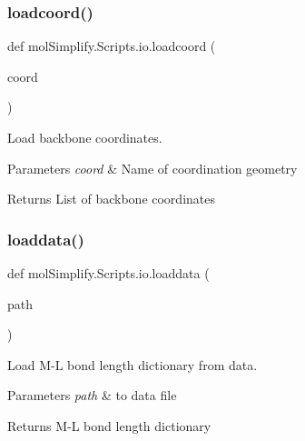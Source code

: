 \subsubsection{\texorpdfstring{loadcoord()}{loadcoord()}}
{\footnotesize\ttfamily def mol\+Simplify.\+Scripts.\+io.\+loadcoord (\begin{DoxyParamCaption}\item[{}]{coord }\end{DoxyParamCaption})}



Load backbone coordinates. 


\begin{DoxyParams}{Parameters}
{\em coord} & Name of coordination geometry \\
\hline
\end{DoxyParams}
\begin{DoxyReturn}{Returns}
List of backbone coordinates 
\end{DoxyReturn}
\mbox{\label{namespacemolSimplify_1_1Scripts_1_1io_adfd1292cc6dcfdbf6b828fe5e7d9ae1f}} 
\subsubsection{\texorpdfstring{loaddata()}{loaddata()}}
{\footnotesize\ttfamily def mol\+Simplify.\+Scripts.\+io.\+loaddata (\begin{DoxyParamCaption}\item[{}]{path }\end{DoxyParamCaption})}



Load M-\/L bond length dictionary from data. 


\begin{DoxyParams}{Parameters}
{\em path} & to data file \\
\hline
\end{DoxyParams}
\begin{DoxyReturn}{Returns}
M-\/L bond length dictionary 
\end{DoxyReturn}
\mbox{\label{namespacemolSimplify_1_1Scripts_1_1io_a64818a07711beacbd714d2c843c51862}} 

